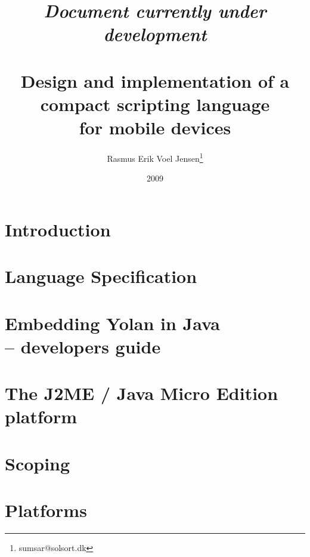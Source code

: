 \documentclass[11pt]{report}
\title{
\emph{Document currently under development} \\ ~ \\
Design and implementation of a \\
compact scripting language \\ 
for mobile devices}
\author{
  Rasmus Erik Voel Jensen\footnote{
    sumsar@solsort.dk
  }
}
\date{2009}
\begin{document}


\setcounter{tocdepth}{1}
\tableofcontents
%

\chapter{Introduction}

\chapter{Language Specification}

\chapter{Embedding Yolan in Java \\ -- developers guide}


\chapter{The J2ME / Java Micro Edition platform}


\chapter{Scoping}





\chapter{Platforms}








%


%
%

%
%


\end{document}
